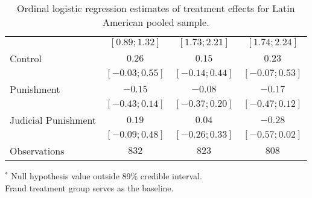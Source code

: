 \begin{table}[h]
\begin{center}
\begin{threeparttable}
\begin{tabular}{l c c c}
                    & $ [ 0.89;  1.32]$ & $ [ 1.73;  2.21]$ & $ [ 1.74;  2.24]$ \\
Control             & $0.26$            & $0.15$            & $0.23$            \\
                    & $ [-0.03;  0.55]$ & $ [-0.14;  0.44]$ & $ [-0.07;  0.53]$ \\
Punishment          & $-0.15$           & $-0.08$           & $-0.17$           \\
                    & $ [-0.43;  0.14]$ & $ [-0.37;  0.20]$ & $ [-0.47;  0.12]$ \\
Judicial Punishment & $0.19$            & $0.04$            & $-0.28$           \\
                    & $ [-0.09;  0.48]$ & $ [-0.26;  0.33]$ & $ [-0.57;  0.02]$ \\
\hline
Observations        & $832$             & $823$             & $808$             \\
\hline
\end{tabular}
\begin{tablenotes}[flushleft]
\scriptsize{$^*$ Null hypothesis value outside 89\% credible interval.  \\
Fraud treatment group serves as the baseline.}
\end{tablenotes}
\end{threeparttable}
\caption{Ordinal logistic regression estimates of treatment effects for Latin American pooled sample.}
\label{table:coefficients}
\end{center}
\end{table}
